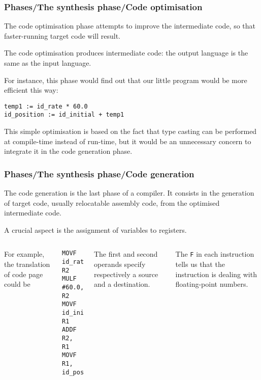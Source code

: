 % 
\begin{frame}[containsverbatim]
\frametitle{Phases/The synthesis phase/Code optimisation}

\label{opt_code}

The code optimisation phase attempts to improve the intermediate code,
so that faster-running target code will result.

\bigskip

The code optimisation produces intermediate code: the output language
is the same as the input language.

\bigskip

For instance, this phase would find out that our little program
would be more efficient this way:
{\small
\begin{verbatim}
temp1 := id_rate * 60.0
id_position := id_initial + temp1
\end{verbatim}
}
This simple optimisation is based on the fact that type casting can be
performed at compile-time instead of run-time, but it would be an
unnecessary concern to integrate it in the code generation phase.

\end{frame}

% 
\begin{frame}[containsverbatim]
\frametitle{Phases/The synthesis phase/Code generation}

The code generation is the last phase of a compiler. It consists in
the generation of target code, usually relocatable assembly code, from
the optimised intermediate code.

\bigskip

A crucial aspect is the assignment of variables to registers.

\bigskip

\begin{columns}
   For example, the translation of code
  page~\pageref{opt_code} could be
{\small
\begin{verbatim}
MOVF id_rate, R2
MULF #60.0, R2
MOVF id_initial, R1
ADDF R2, R1
MOVF R1, id_position
\end{verbatim}
}

   The first and second operands specify
  respectively a source and a destination.

  \bigskip

  The \texttt{F} in each instruction tells us that the instruction is
  dealing with floating-point numbers.
\end{columns}

\end{frame}

